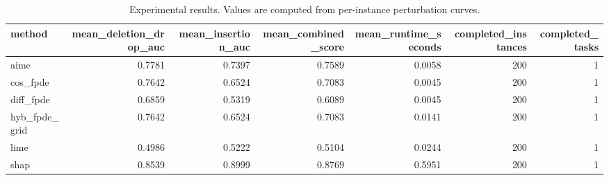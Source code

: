 \begin{table}[t]
\caption{Experimental results. Values are computed from per-instance perturbation curves.}
\label{tab:main_results_computed}
\centering
\begin{tabular}{lrrrrrr}
\toprule
method & mean\_deletion\_drop\_auc & mean\_insertion\_auc & mean\_combined\_score & mean\_runtime\_seconds & completed\_instances & completed\_tasks \\
\midrule
aime & 0.7781 & 0.7397 & 0.7589 & 0.0058 & 200 & 1 \\
cos\_fpde & 0.7642 & 0.6524 & 0.7083 & 0.0045 & 200 & 1 \\
diff\_fpde & 0.6859 & 0.5319 & 0.6089 & 0.0045 & 200 & 1 \\
hyb\_fpde\_grid & 0.7642 & 0.6524 & 0.7083 & 0.0141 & 200 & 1 \\
lime & 0.4986 & 0.5222 & 0.5104 & 0.0244 & 200 & 1 \\
shap & 0.8539 & 0.8999 & 0.8769 & 0.5951 & 200 & 1 \\
\bottomrule
\end{tabular}

\end{table}
